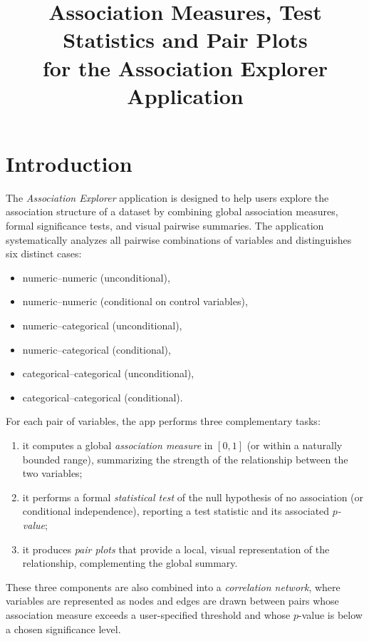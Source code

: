 \documentclass[11pt,a4paper]{article}
\title{Association Measures, Test Statistics and Pair Plots\\
  for the Association Explorer Application}
\author{}
\date{}
\begin{document}
\maketitle

\section{Introduction}

The \emph{Association Explorer} application is designed to help users explore the association structure of a dataset by combining global association measures, formal significance tests, and visual pairwise summaries. The application systematically analyzes all pairwise combinations of variables and distinguishes six distinct cases:
\begin{itemize}
\item numeric--numeric (unconditional),
\item numeric--numeric (conditional on control variables),
\item numeric--categorical (unconditional),
\item numeric--categorical (conditional),
\item categorical--categorical (unconditional),
\item categorical--categorical (conditional).
\end{itemize}

For each pair of variables, the app performs three complementary tasks:
\begin{enumerate}
\item it computes a global \emph{association measure} in $[0,1]$ (or within a naturally bounded range), summarizing the strength of the relationship between the two variables;
\item it performs a formal \emph{statistical test} of the null hypothesis of no association (or conditional independence), reporting a test statistic and its associated \emph{$p$-value};
\item it produces \emph{pair plots} that provide a local, visual representation of the relationship, complementing the global summary.
\end{enumerate}

These three components are also combined into a \emph{correlation network}, where variables are represented as nodes and edges are drawn between pairs whose association measure exceeds a user-specified threshold and whose $p$-value is below a chosen significance level.

\medskip
\end{document}
